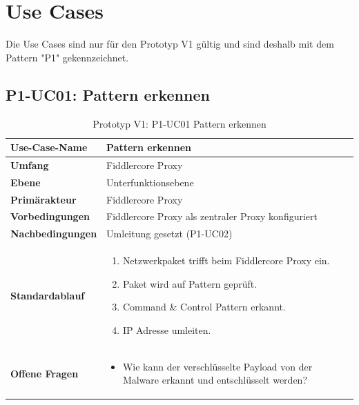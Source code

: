 \section{Use Cases}
Die Use Cases sind nur für den Prototyp V1 gültig und sind deshalb mit dem Pattern "P1" gekennzeichnet.

\begin{table}[H]
	\subsection{P1-UC01: Pattern erkennen}
    \centering
    \begin{tabularx}{\textwidth}{| l | p{} |}
        \hline
        \textbf{Use-Case-Name}     & \textbf{Pattern erkennen}    \\ \hline
        \textbf{Umfang}  & Fiddlercore Proxy     \\ \hline
        \textbf{Ebene} & Unterfunktionsebene   \\ \hline
        \textbf{Primärakteur} & Fiddlercore Proxy \\ \hline
        \textbf{Vorbedingungen} & Fiddlercore Proxy als zentraler Proxy konfiguriert \\ \hline
        \textbf{Nachbedingungen} & Umleitung gesetzt (P1-UC02) \\ \hline
        \textbf{Standardablauf} & \begin{enumerate}
        	\item Netzwerkpaket trifft beim Fiddlercore Proxy ein.
        	\item Paket wird auf Pattern geprüft.
        	\item Command \& Control Pattern erkannt.
        	\item IP Adresse umleiten.
        \end{enumerate} \\ \hline
        \textbf{Offene Fragen} & \begin{itemize}
        	\item Wie kann der verschlüsselte Payload von der Malware erkannt und entschlüsselt werden?
        \end{itemize} \\ \hline
    \end{tabularx}
    \caption{Prototyp V1: P1-UC01 Pattern erkennen}
\end{table}


